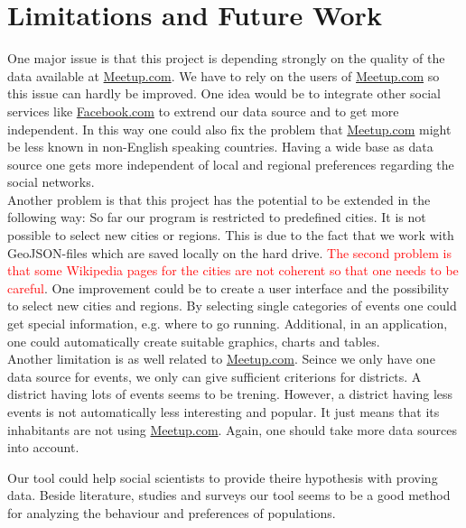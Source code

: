 \section{Limitations and Future Work}\label{sec:limitationsandfuturework}

One major issue is that this project is depending strongly on the quality of the data available at \url{Meetup.com}. We have to rely on the users of \url{Meetup.com} so this issue can hardly be improved. One idea would be to integrate other social services like \url{Facebook.com} to extrend our data source and to get more independent. In this way one could also fix the problem that \url{Meetup.com} might be less known in non-English speaking countries. Having a wide base as data source one gets more independent of local and regional preferences regarding the social networks.\\Another problem is that this project has the potential to be extended in the following way: So far our program is restricted to predefined cities. It is not possible to select new cities or regions. This is due to the fact that we work with GeoJSON-files which are saved locally on the hard drive. \textcolor{red}{The second problem is that some Wikipedia pages for the cities are not coherent so that one needs to be careful}. One improvement could be to create a user interface and the possibility to select new cities and regions. By selecting single categories of events one could get special information, e.g. where to go running. Additional, in an application, one could automatically create suitable graphics, charts and tables.\\Another limitation is as well related to \url{Meetup.com}. Seince we only have one data source for events, we only can give sufficient criterions for districts. A district having lots of events seems to be trening. However, a district having less events is not automatically less interesting and popular. It just means that its inhabitants are not using \url{Meetup.com}. Again, one should take more data sources into account.

Our tool could help social scientists to provide theire hypothesis with proving data. Beside literature, studies and surveys our tool seems to be a good method for analyzing the behaviour and preferences of populations.